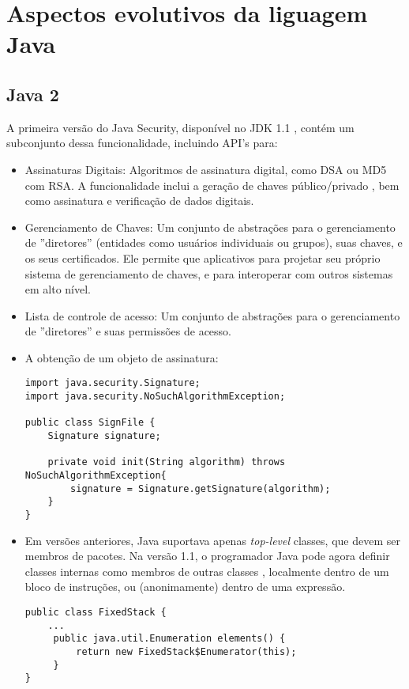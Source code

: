 \section {Aspectos evolutivos da liguagem Java}
		\subsection {Java 2}
			A primeira versão do Java Security, disponível no \acs{JDK} 1.1 \cite{JDK1.1}, contém um subconjunto dessa funcionalidade, incluindo \acs{API}'s para:
		  \begin{itemize}
			  \item Assinaturas Digitais: Algoritmos de assinatura digital, como \acs{DSA} ou \acs{MD5} com \acs{RSA}. A funcionalidade inclui a geração de chaves público/privado , bem como assinatura e verificação de dados digitais.
			  \item Gerenciamento de Chaves: Um conjunto de abstrações para o gerenciamento de ''diretores'' (entidades como usuários individuais ou grupos), suas chaves, e os seus certificados. Ele permite que aplicativos para projetar seu próprio sistema de gerenciamento de chaves, e para interoperar com outros sistemas em alto nível.
			  \item Lista de controle de acesso: Um conjunto de abstrações para o gerenciamento de ''diretores'' e suas permissões de acesso.
			  \item A obtenção de um objeto de assinatura: 
			  
\begin{lstlisting}
import java.security.Signature;
import java.security.NoSuchAlgorithmException;
	
public class SignFile {
	Signature signature;
		
	private void init(String algorithm) throws NoSuchAlgorithmException{
		signature = Signature.getSignature(algorithm);
    }
}
\end{lstlisting}
			  
			  \item Em versões anteriores, Java suportava apenas {\it top-level} classes, que devem ser membros de pacotes. Na versão 1.1, o programador Java pode agora definir classes internas como membros de outras classes \cite{bracha1998gj}, localmente dentro de um bloco de instruções, ou (anonimamente) dentro de uma expressão.
		  
\begin{lstlisting}
public class FixedStack {
	...
	 public java.util.Enumeration elements() {
	     return new FixedStack$Enumerator(this);
	 }
}
		

\end{lstlisting}
\end{itemize}
